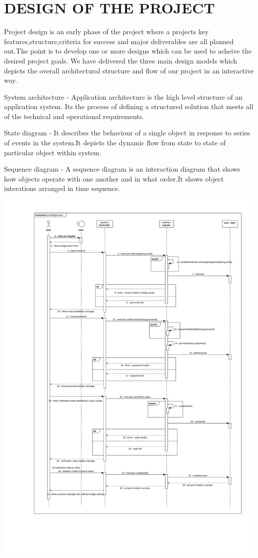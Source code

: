 
\chapter{\uppercase{Design of the project }} %
\label{ch:survey} %

Project design is an early phase of the project where a projects key
features,structure,criteria for success and major deliverables are all planned out.The
point is to develop one or more designs which can be used to acheive the desired
project goals.
We have delivered the three main design models which depicts the
overall architectural structure and flow of our project in an interactive way.

System architecture - Application architecture is the high level structure
of an application system. Its the process of defining a structured solution that
meets all of the technical and operational requirements.

State diagram - It describes the behaviour of a single object in response
to series of events in the system.It depicts the dynamic flow from state to state
of particular object within system.

Sequence diagram - A sequence diagram is an interaction diagram
that shows how objects operate with one another and in what order.It shows
object interations arranged in time sequence.


\begin{center}
  \includegraphics[scale=0.275]{user-registration-1.jpg} \\
\end{center}
